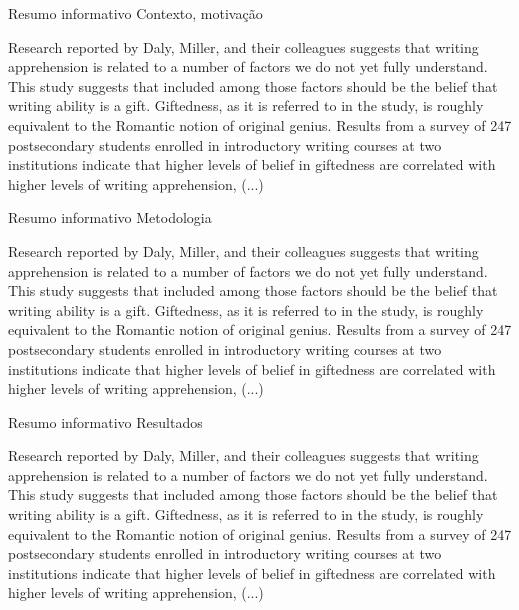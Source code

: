 \documentclass{beamer}
\begin{document}
\begin{frame}{Resumo informativo}
  Contexto, motivação
  \begin{example}
    \alert{Research reported by Daly, Miller, and their colleagues
      suggests that writing apprehension is related to a number of
      factors we do not yet fully understand. This study suggests that
      included among those factors should be the belief that writing
      ability is a gift. Giftedness, as it is referred to in the
      study, is roughly equivalent to the Romantic notion of original
      genius.} Results from a survey of 247 postsecondary students
    enrolled in introductory writing courses at two institutions
    indicate that higher levels of belief in giftedness are correlated
    with higher levels of writing apprehension, (...)
  \end{example}
\end{frame}

\begin{frame}{Resumo informativo}
Metodologia
  \begin{example}
    Research reported by Daly, Miller, and their colleagues suggests
    that writing apprehension is related to a number of factors we do
    not yet fully understand. This study suggests that included among
    those factors should be the belief that writing ability is a
    gift. Giftedness, as it is referred to in the study, is roughly
    equivalent to the Romantic notion of original genius. Results from
    \alert{a survey of 247 postsecondary students enrolled in
      introductory writing courses at two institutions} indicate that
    higher levels of belief in giftedness are correlated with higher
    levels of writing apprehension, (...)
  \end{example}
\end{frame}

\begin{frame}{Resumo informativo}
Resultados
  \begin{example}
    Research reported by Daly, Miller, and their colleagues suggests
    that writing apprehension is related to a number of factors we do
    not yet fully understand. This study suggests that included among
    those factors should be the belief that writing ability is a
    gift. Giftedness, as it is referred to in the study, is roughly
    equivalent to the Romantic notion of original
    genius. \alert{Results} from a survey of 247 postsecondary
    students enrolled in introductory writing courses at two
    institutions \alert{indicate that higher levels of belief in
      giftedness are correlated with higher levels of writing
      apprehension,} (...)
  \end{example}
\end{frame}
\end{document}

